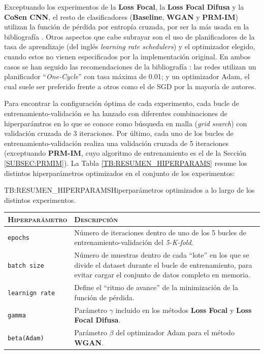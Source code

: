 Exceptuando los experimentos de la \textbf{Loss Focal}, la \textbf{Loss Focal Difusa} y la \textbf{CoSen CNN}, el resto de clasificadores (\textbf{Baseline}, \textbf{WGAN} y \textbf{PRM-IM}) utilizan la función de pérdida por entropía cruzada, por ser la más usada en la bibliografía \cite{wu2020gender,islam2020human,garain2021gra_net,agbo2020deeply,sumi2021human,zhang2020gender}. Otros aspectos que cabe subrayar son el uso de planificadores de la tasa de aprendizaje (del inglés \textit{learning rate schedulers}) y el optimizador elegido, cuando estos no vienen especificados por la implementación original. En ambos casos se han seguido las recomendaciones de la bibliografía \cite{wu2020gender,islam2020human,garain2021gra_net,agbo2020deeply,sumi2021human,zhang2020gender}: las redes utilizan un planificador ``\textit{One-Cycle}'' con tasa máxima de 0.01; y un optimizador Adam, el cual suele ser preferido frente a otros como el de SGD por la mayoría de autores.

Para encontrar la configuración óptima de cada experimento, cada bucle de entrenamiento-validación se ha lanzado con diferentes combinaciones de hiperparámtros en lo que se conoce como búsqueda en malla (\textit{grid search}) con validación cruzada de 3 iteraciones. Por último, cada uno de los bucles de entrenamiento-validación realiza una validación cruzada de 5 iteraciones (exceptuando \textbf{PRM-IM}, cuyo algoritmo de entrenamiento es el de la Sección \ref{SUBSEC:PRMIM}). La Tabla \ref{TB:RESUMEN_HIPERPARAMS} resume los distintos hiperparámetros optimizados en el conjunto de los experimentos:

\begin{table}[Resumen de hiperparámetros]{TB:RESUMEN_HIPERPARAMS}{Hiperparámetros optimizados a lo largo de los distintos experimentos.}
    \small
    \begin{tabular}{|l|p{13cm}|}
        \hline
        \textsc{Hiperparámetro} & \textsc{Descripción} \\
        \hline
        \texttt{epochs} & Número de iteraciones dentro de uno de los 5 bucles de entrenamiento-validación del \textit{5-K-fold}. \\ \hline
        \texttt{batch size} & Número de muestras dentro de cada ``lote'' en los que se divide el dataset durante el bucle de entrenamiento, para evitar cargar el conjunto de datos completo en memoria. \\ \hline
        \texttt{learnign rate} & Define el ``ritmo de avance'' de la minimización de la función de pérdida. \\ \hline
        \texttt{gamma} & Parámetro $\gamma$ incluido en los métodos \textbf{Loss Focal} y \textbf{Loss Focal Difusa}. \\ \hline
        \texttt{beta(Adam)} & Parámetro $\beta$ del optimizador Adam \cite{NEURIPS2019_9015} para el método \textbf{WGAN}. \\ \hline
    \end{tabular}
\end{table}






